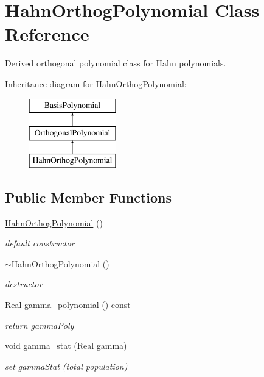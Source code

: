 \section{Hahn\+Orthog\+Polynomial Class Reference}
\label{classPecos_1_1HahnOrthogPolynomial}


Derived orthogonal polynomial class for Hahn polynomials.  


Inheritance diagram for Hahn\+Orthog\+Polynomial\+:\begin{figure}[H]
\begin{center}
\leavevmode
\includegraphics[height=3.000000cm]{classPecos_1_1HahnOrthogPolynomial}
\end{center}
\end{figure}
\subsection*{Public Member Functions}
\begin{DoxyCompactItemize}
\item 
\hyperlink{classPecos_1_1HahnOrthogPolynomial_a4c8c514febcc0b10dbc35aff617217b7}{Hahn\+Orthog\+Polynomial} ()\label{classPecos_1_1HahnOrthogPolynomial_a4c8c514febcc0b10dbc35aff617217b7}

\begin{DoxyCompactList}\small\item\em default constructor \end{DoxyCompactList}\item 
\hyperlink{classPecos_1_1HahnOrthogPolynomial_a165697a95cb62aba335fcae04c1bd5b8}{$\sim$\+Hahn\+Orthog\+Polynomial} ()\label{classPecos_1_1HahnOrthogPolynomial_a165697a95cb62aba335fcae04c1bd5b8}

\begin{DoxyCompactList}\small\item\em destructor \end{DoxyCompactList}\item 
Real \hyperlink{classPecos_1_1HahnOrthogPolynomial_a09f97f3d11434d8e62f63068ca8ce93f}{gamma\+\_\+polynomial} () const \label{classPecos_1_1HahnOrthogPolynomial_a09f97f3d11434d8e62f63068ca8ce93f}

\begin{DoxyCompactList}\small\item\em return gamma\+Poly \end{DoxyCompactList}\item 
void \hyperlink{classPecos_1_1HahnOrthogPolynomial_ad8e1174347b31063f1cc138be5da3199}{gamma\+\_\+stat} (Real gamma)\label{classPecos_1_1HahnOrthogPolynomial_ad8e1174347b31063f1cc138be5da3199}

\begin{DoxyCompactList}\small\item\em set gamma\+Stat (total population) \end{DoxyCompactList}\end{DoxyCompactItemize}
